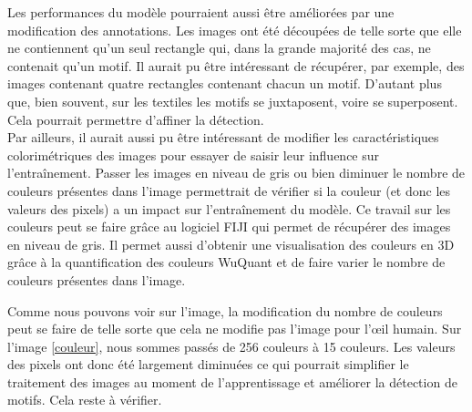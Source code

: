\documentclass[a4paper, twoside, 12pt]{book}
\begin{document}
Les performances du modèle pourraient aussi être améliorées par une modification des annotations. Les images ont été découpées de telle sorte que elle ne contiennent qu'un seul rectangle qui, dans la grande majorité des cas, ne contenait qu'un motif. Il aurait pu être intéressant de récupérer, par exemple, des images contenant quatre rectangles contenant chacun un motif. D'autant plus que, bien souvent, sur les textiles les motifs se juxtaposent, voire se superposent. Cela pourrait permettre d'affiner la détection. \\

Par ailleurs, il aurait aussi pu être intéressant de modifier les caractéristiques colorimétriques des images pour essayer de saisir leur influence sur l'entraînement. Passer les images en niveau de gris ou bien diminuer le nombre de couleurs présentes dans l'image permettrait de vérifier si la couleur (et donc les valeurs des pixels) a un impact sur l'entraînement du modèle. Ce travail sur les couleurs peut se faire grâce au logiciel FIJI qui permet de récupérer des images en niveau de gris. Il permet aussi d'obtenir une visualisation des couleurs en 3D grâce à la quantification des couleurs WuQuant et de faire varier le nombre de couleurs présentes dans l'image.

Comme nous pouvons voir sur l'image, la modification du nombre de couleurs peut se faire de telle sorte que cela ne modifie pas l'image pour l'\oe{}il humain. Sur l'image \ref{couleur}, nous sommes passés de 256 couleurs à 15 couleurs. Les valeurs des pixels ont donc été largement diminuées ce qui pourrait simplifier le traitement des images au moment de l'apprentissage et améliorer la détection de motifs. Cela reste à vérifier.
\end{document}
